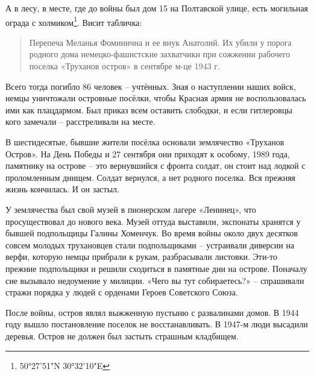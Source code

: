 А в лесу, в месте, где до войны был дом 15 на Полтавской улице, есть могильная ограда с холмиком\footnote{50°27'51"N 30°32'10"E}. Висит табличка:         

\begin{quotation}
Перепеча Меланья Фоминична и ее внук Анатолий. Их убили у порога родного дома немецко-фашист\-ские захватчики при сожжении рабочего поселка «Труханов остров» в сентябре м-це 1943 г.
\end{quotation}

Всего тогда погибло 86 человек – учтённых. Зная о наступлении наших войск, немцы уничтожали островные посёлки, чтобы Красная армия не воспользовалась ими как плацдармом. Был приказ всем оставить слободки, и если гитлеровцы кого замечали – расстреливали на месте.

В шестидесятые, бывшие жители посёлка основали землячество «Труханов Остров». На День Победы и 27 сентября они приходят к особому, 1989 года, памятнику на острове – это вернувшийся с фронта солдат, он стоит над лодкой с проломленным днищем. Солдат вернулся, а нет родного поселка. Вся прежняя жизнь кончилась. И он застыл.

У землячества был свой музей в пионерском лагере «Ленинец», что просуществовал до нового века. Музей оттуда выставили, экспонаты хранятся у бывшей подпольщицы Галины Хоменчук. Во время войны около двух десятков совсем молодых трухановцев стали подпольщиками – устраивали диверсии на верфи, которую немцы прибрали к рукам, разбрасывали листовки. Эти-то прежние подпольщики и решили сходиться в памятные дни на острове. Поначалу сие вызывало недоумение у милиции. «Чего вы тут собираетесь?» – спрашивали стражи порядка у людей с орденами Героев Советского Союза.%


После войны, остров являл выжженную пустыню с развалинами домов. В 1944 году вышло постановление поселок не восстанавливать. В 1947-м люди высадили деревья. Остров не должен был застыть страшным кладбищем. 

